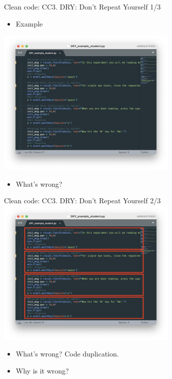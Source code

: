 \documentclass[
  8pt,
  ignorenonframetext,
]{beamer}
\providecommand{\tightlist}{%
  \setlength{\itemsep}{0pt}\setlength{\parskip}{0pt}}
\begin{document}
\begin{frame}{Clean code: CC3. DRY: Don't Repeat Yourself 1/3}
\protect\hypertarget{clean-code-cc3.-dry-dont-repeat-yourself-13}{}
\begin{itemize}
\tightlist
\item
  Example
\end{itemize}

\includegraphics[width=0.65\textwidth,height=\textheight]{student_example1.png}

\begin{itemize}
\tightlist
\item
  What's wrong?
\end{itemize}
\end{frame}

\begin{frame}{Clean code: CC3. DRY: Don't Repeat Yourself 2/3}
\protect\hypertarget{clean-code-cc3.-dry-dont-repeat-yourself-23}{}
\includegraphics[width=0.65\textwidth,height=\textheight]{student_example1_features.png}

\begin{itemize}
\item
  What's wrong? Code duplication.
\item
  Why is it wrong?
\end{itemize}
\end{frame}
\end{document}
